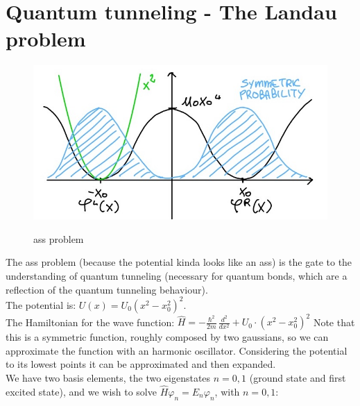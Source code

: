 \section{Quantum tunneling - The Landau problem}
\begin{figure}[htbp!]
	\centering
	\includegraphics[scale=0.30]{img_2.jpg}
	\label{fig:ass}
	\caption{ass problem}
\end{figure}
The ass problem (because the potential kinda looks like an ass) is the gate to the understanding of quantum tunneling (necessary for quantum bonds, which are a reflection of the quantum tunneling behaviour). \\
The potential is: $U(x)=U_0(x^2-x_0^2)^2$.\\

The Hamiltonian for the wave function: $\hat{H}=-\frac{\hbar^2}{2m}\,\frac{d^2}{dx^2}+U_0\cdot(x^2-x_0^2)^2$
Note that this is a symmetric function, roughly composed by two gaussians, so we can approximate the function with an harmonic oscillator. Considering the potential to its lowest points it can be approximated and then expanded. \\

We have two basis elements, the two eigenstates $n=0,1$ (ground state and first excited state), and we wish to solve $\hat{H}\varphi_n=E_n\varphi_n$, with $n=0,1$:

